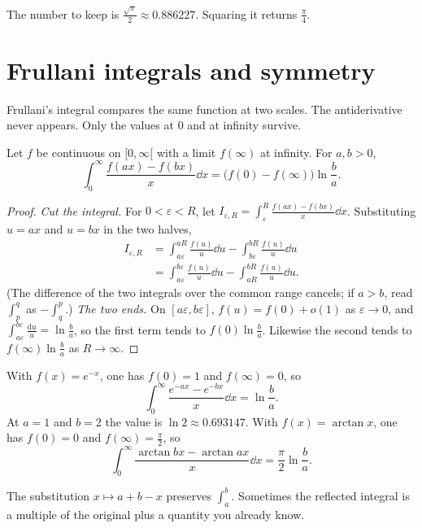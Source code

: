 The number to keep is $\frac{\sqrt\pi}2\approx0.886227$. Squaring it returns $\frac\pi4$.

\section{Frullani integrals and symmetry}

Frullani's integral compares the same function at two scales. The antiderivative never appears. Only the values at $0$ and at infinity survive.

\begin{theorem}[Frullani]\label{thm:frullani}
Let $f$ be continuous on $[0,\infty[$ with a limit $f(\infty)$ at infinity. For $a,b>0$,
\[
\int_0^\infty\frac{f(ax)-f(bx)}x\dd x=\bigl(f(0)-f(\infty)\bigr)\ln\frac ba.
\]
\end{theorem}
\begin{proof}
\emph{Cut the integral.}
For $0<\varepsilon<R$, let $I_{\varepsilon,R}=\int_\varepsilon^R\frac{f(ax)-f(bx)}x\dd x$. Substituting $u=ax$ and $u=bx$ in the two halves,
\[
\begin{aligned}I_{\varepsilon,R}&=\int_{a\varepsilon}^{aR}\frac{f(u)}u\dd u-\int_{b\varepsilon}^{bR}\frac{f(u)}u\dd u\\&=\int_{a\varepsilon}^{b\varepsilon}\frac{f(u)}u\dd u-\int_{aR}^{bR}\frac{f(u)}u\dd u.\end{aligned}
\]
(The difference of the two integrals over the common range cancels; if $a>b$, read $\int_p^q$ as $-\int_q^p$.)
\emph{The two ends.}
On
$[a\varepsilon,b\varepsilon]$, $f(u)=f(0)+o(1)$ as $\varepsilon\to0$, and $\int_{a\varepsilon}^{b\varepsilon}\frac{\mathrm du}u=\ln\frac ba$, so the first term tends to
$f(0)\ln\frac ba$. Likewise the second tends to $f(\infty)\ln\frac ba$ as $R\to\infty$.
\end{proof}

With $f(x)=e^{-x}$, one has $f(0)=1$ and $f(\infty)=0$, so
\[
\int_0^\infty\frac{e^{-ax}-e^{-bx}}x\dd x=\ln\frac ba.
\]
At $a=1$ and $b=2$ the value is $\ln 2\approx0.693147$. With $f(x)=\arctan x$, one has $f(0)=0$ and $f(\infty)=\frac\pi2$, so
\[
\int_0^\infty\frac{\arctan bx-\arctan ax}x\dd x=\frac\pi2\ln\frac ba.
\]

The substitution $x\mapsto a+b-x$ preserves $\int_a^b$. Sometimes the reflected integral is a multiple of the original plus a quantity you already know.

